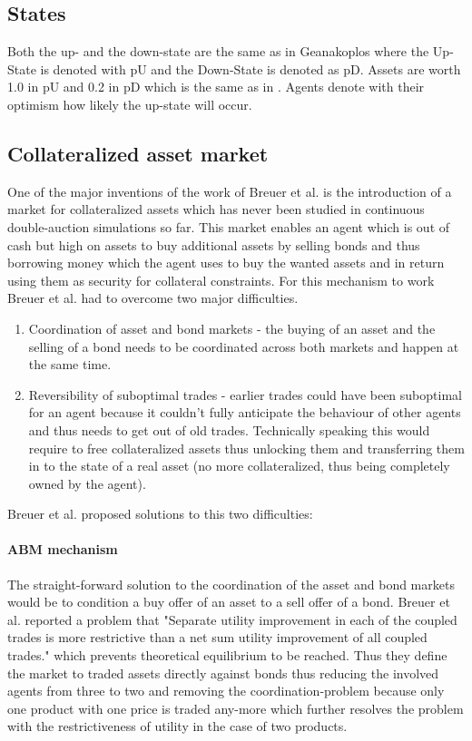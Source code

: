 \documentclass[../Bachelorarbeit.tex]{subfiles}
\begin{document}
\subsection{States}
Both the up- and the down-state are the same as in Geanakoplos where the Up-State is denoted with pU and the Down-State is denoted as pD. Assets are worth 1.0 in pU and 0.2 in pD which is the same as in \cite{Geanakoplos2009}. Agents denote with their optimism how likely the up-state will occur.

\subsection{Collateralized asset market}
One of the major inventions of the work of Breuer et al. is the introduction of a market for collateralized assets which has never been studied in continuous double-auction simulations so far. This market enables an agent which is out of cash but high on assets to buy additional assets by selling bonds and thus borrowing money which the agent uses to buy the wanted assets and in return using them as security for collateral constraints. For this mechanism to work Breuer et al. had to overcome two major difficulties.

\begin{enumerate}
\item Coordination of asset and bond markets - the buying of an asset and the selling of a bond needs to be coordinated across both markets and happen at the same time.
\item Reversibility of suboptimal trades - earlier trades could have been suboptimal for an agent because it couldn't fully anticipate the behaviour of other agents and thus needs to get out of old trades. Technically speaking this would require to free collateralized assets thus unlocking them and transferring them in to the state of a real asset (no more collateralized, thus being completely owned by the agent).
\end{enumerate}

Breuer et al. proposed solutions to this two difficulties:
\paragraph{ABM mechanism}
The straight-forward solution to the coordination of the asset and bond markets would be to condition a buy offer of an asset to a sell offer of a bond. Breuer et al. reported a problem that "Separate utility improvement in each of the coupled trades is more restrictive than a net sum utility improvement of all coupled trades." which prevents theoretical equilibrium to be reached. Thus they define the market to traded assets directly against bonds thus reducing the involved agents from three to two and removing the coordination-problem because only one product with one price is traded any-more which further resolves the problem with the restrictiveness of utility in the case of two products.
\end{document}
